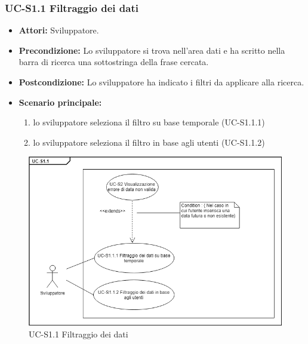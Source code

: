 	\subsubsection{UC-S1.1 Filtraggio dei dati}	
		\begin{itemize}
			\item \textbf{Attori:} Sviluppatore.
			\item \textbf{Precondizione:} Lo sviluppatore si trova nell'area dati e ha scritto nella barra di ricerca una sottostringa della frase cercata.
			\item \textbf{Postcondizione:} Lo sviluppatore ha indicato i filtri da applicare alla ricerca.
			\item \textbf{Scenario principale:}
				\begin{enumerate}
					\item lo sviluppatore seleziona il filtro su base temporale (UC-S1.1.1)
					\item lo sviluppatore seleziona il filtro in base agli utenti (UC-S1.1.2)
				\end{enumerate}
			\end{itemize}
	\begin{figure}[h]
			\centering
			\includegraphics[scale=0.7]{images/UC-S1_1.png}
			\caption{UC-S1.1 Filtraggio dei dati}
		\end{figure}	
	
